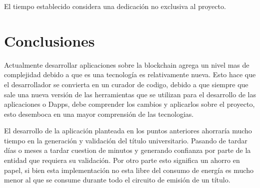 \documentclass[11pt,a4paper]{article}
\begin{document}
        El tiempo establecido considera una dedicación no exclusiva al proyecto.
 
    \section{Conclusiones}

    Actualmente desarrollar aplicaciones sobre la blockchain agrega un nivel mas de complejidad debido
    a que es una tecnología es relativamente nueva. Esto hace que el desarrollador se convierta en un 
    curador de codigo, debido a que siempre que sale una nueva versión de las herramientas que se 
    utilizan para el desarrollo de las aplicaciones o Dapps, debe comprender los cambios y aplicarlos sobre el
    proyecto, esto desemboca en una mayor comprensión de las tecnologias.
    
    El desarrollo de la aplicación planteada en los puntos anteriores ahorraría mucho tiempo en la generación y 
    validación del título universitario. Pasando de tardar días o meses a tardar cuestion de minutos y generando confianza por parte de 
    la entidad que requiera su validación. Por otro parte esto significa un ahorro en papel, si bien esta implementación no esta 
    libre del consumo de energía es mucho menor al que se consume durante todo el circuito de emisión de un título.






\end{document}
